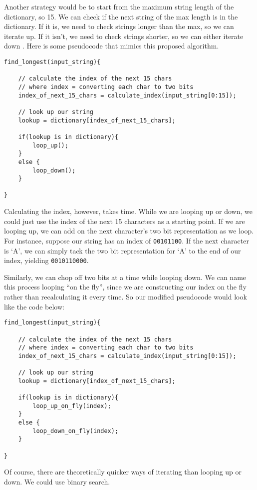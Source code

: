\documentclass[12pt,twoside]{reedthesis}
\begin{document}
Another strategy would be to start from the maximum string length of the dictionary, so 15. We can check if the next string of the max length is in the dictionary. If it is, we need to check strings longer than the max, so we can iterate up. If it isn't, we need to check strings shorter, so we can either iterate down . Here is some pseudocode that mimics this proposed algorithm.
\begin{verbatim}
find_longest(input_string){

    // calculate the index of the next 15 chars
    // where index = converting each char to two bits
    index_of_next_15_chars = calculate_index(input_string[0:15]);

    // look up our string
    lookup = dictionary[index_of_next_15_chars];

    if(lookup is in dictionary){
        loop_up();
    }
    else {
        loop_down();
    }
    
}
\end{verbatim}
Calculating the index, however, takes time. While we are looping up or down, we could just use the index of the next 15 characters as a starting point. If we are looping up, we can add on the next character's two bit representation as we loop. For instance, suppose our string has an index of \texttt{00101100}. If the next character is `A', we can simply tack the two bit representation for `A' to the end of our index, yielding \texttt{00101100\textbar{}00}.

Similarly, we can chop off two bits at a time while looping down. We can name this process looping ``on the fly'', since we are constructing our index on the fly rather than recalculating it every time. So our modified pseudocode would look like the code below:
\begin{verbatim}
find_longest(input_string){

    // calculate the index of the next 15 chars
    // where index = converting each char to two bits
    index_of_next_15_chars = calculate_index(input_string[0:15]);

    // look up our string
    lookup = dictionary[index_of_next_15_chars];

    if(lookup is in dictionary){
        loop_up_on_fly(index);
    }
    else {
        loop_down_on_fly(index);
    }
    
}
\end{verbatim}
Of course, there are theoretically quicker ways of iterating than looping up or down. We could use binary search.
\end{document}
